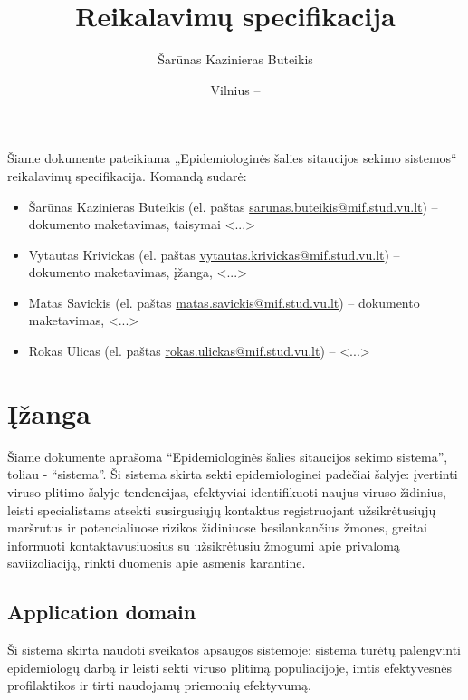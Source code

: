 \documentclass{VUMIFPSkursinis}
\title{Reikalavimų specifikacija}
\author{Šarūnas Kazinieras Buteikis}
\date{Vilnius – \the\year}
\begin{document}
\maketitle


Šiame dokumente pateikiama „Epidemiologinės šalies sitaucijos sekimo sistemos“
reikalavimų specifikacija. Komandą sudarė:
\begin{itemize}
	\item Šarūnas Kazinieras Buteikis (el. paštas \href{mailto:sarunas.buteikis@mif.stud.vu.lt}{sarunas.buteikis@mif.stud.vu.lt}) -- dokumento maketavimas, taisymai  {\color{red}<...>}
	\item Vytautas Krivickas (el. paštas \href{mailto:vytautas.krivickas@mif.stud.vu.lt}{vytautas.krivickas@mif.stud.vu.lt}) -- dokumento maketavimas, įžanga, {\color{red}<...>}
	\item Matas Savickis (el. paštas \href{mailto:matas.savickis@mif.stud.vu.lt}{matas.savickis@mif.stud.vu.lt}) -- dokumento maketavimas, {\color{red}<...>}
	\item Rokas Ulicas (el. paštas \href{mailto:rokas.ulickas@mif.stud.vu.lt}{rokas.ulickas@mif.stud.vu.lt}) -- {\color{red}<...>}
\end{itemize}

\newpage

\tableofcontents

\section{Įžanga}
Šiame dokumente aprašoma “Epidemiologinės šalies sitaucijos sekimo sistema”, toliau - “sistema”.
Ši sistema skirta sekti epidemiologinei padėčiai šalyje: įvertinti viruso plitimo šalyje tendencijas,
efektyviai identifikuoti naujus viruso židinius, leisti specialistams atsekti susirgusiųjų
kontaktus registruojant užsikrėtusiųjų maršrutus ir potencialiuose rizikos židiniuose
besilankančius žmones, greitai informuoti kontaktavusiuosius su užsikrėtusiu žmogumi
apie privalomą saviizoliaciją, rinkti duomenis apie asmenis karantine.

\subsection{Application domain}
Ši sistema skirta naudoti sveikatos apsaugos sistemoje: sistema turėtų palengvinti
epidemiologų darbą ir leisti sekti viruso plitimą populiacijoje, imtis efektyvesnės
profilaktikos ir tirti naudojamų priemonių efektyvumą.
\end{document}
